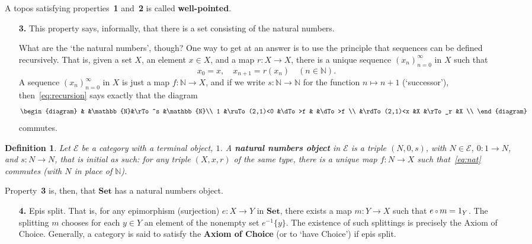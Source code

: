 \documentclass{article}
\newcommand{\cat}[1]{\mathscr{#1}}
\newcommand{\fcat}[1]{\mathbf{#1}}
\newcommand{\Set}{\fcat{Set}}
\newcommand{\demph}[1]{\textbf{\textup{#1}}}
\newcommand{\nat}{\mathbb{N}}
\newcommand{\of}{\,\raisebox{0.08ex}{\ensuremath{\scriptstyle\circ}}\,}
\newcommand{\E}{\cat{E}}
\newcommand{\cln}{\colon}
\newtheorem{predefn}[thm]{Definition}
\newenvironment{defn}{\begin{predefn}\upshape}{\end{predefn}}
\begin{document}
A topos satisfying properties~\textbf{1} and~\textbf{2} is called
\demph{well-pointed}.  

\begin{enumerate}
\item[\textbf{3.}] 
This property says, informally, that there is a set consisting of the natural
numbers. 

What are the `the natural numbers', though?  One way to get at an answer is
to use the principle that sequences can be defined recursively.  That is,
given a set $X$, an element $x \in X$, and a map $r\cln X \to X$, there is a
unique sequence $(x_n)_{n = 0}^\infty$ in $X$ such that 
% 
\begin{equation}
\label{eq:recursion}
x_0 = x,
\quad
x_{n + 1} = r(x_n) 
\quad(n \in \nat).
\end{equation}
% 
A sequence $(x_n)_{n = 0}^\infty$ in $X$ is just a map $f\cln \nat \to X$,
and if we write $s\cln \nat \to \nat$ for the function $n \mapsto n + 1$
(`successor'), then~\eqref{eq:recursion} says exactly that the diagram
% 
\begin{equation}
\label{eq:nat}
\begin{diagram}
        &               &\nat   &\rTo^s &\nat   \\
1       &\ruTo(2,1)<0   &\dTo>f &       &\dTo>f \\
        &\rdTo(2,1)<x   &X      &\rTo_r &X      \\
\end{diagram}
\end{equation}
% 
commutes.
\end{enumerate}

\begin{defn}
Let $\E$ be a category with a terminal object, $1$.  A \demph{natural numbers
object} in $\E$ is a triple $(N, 0, s)$, with $N \in \E$, $0\cln 1 \to N$, and
$s\cln N \to N$, that is initial as such: for any triple $(X, x, r)$ of
the same type, there is a unique map $f\cln N \to X$ such that~\eqref{eq:nat}
commutes (with $N$ in place of $\nat$).
\end{defn}

Property~\textbf{3} is, then, that $\Set$ has a natural numbers object.

\begin{enumerate}
\item[\textbf{4.}] 
Epis split.  That is, for any epimorphism (surjection) $e\cln X \to Y$ in
$\Set$, there exists a map $m\cln Y \to X$ such that $e \of m = 1_Y$.  The
splitting $m$ chooses for each $y \in Y$ an element of the nonempty set
$e^{-1}\{y\}$.  The existence of such splittings is precisely the Axiom of
Choice.  Generally, a category is said to satisfy the \demph{Axiom of Choice}
(or to `have Choice') if epis split.
\end{enumerate}
\end{document}
